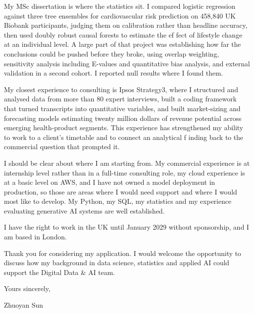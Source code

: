 \documentclass[letterpaper,11pt]{article}
\begin{document}
My MSc dissertation is where the statistics sit. I compared logistic regression against three tree ensembles for cardiovascular risk prediction on 458,840 UK Biobank participants, judging them on calibration rather than headline accuracy, then used doubly robust causal forests to estimate the ef\kern0pt fect of lifestyle change at an individual level. A large part of that project was establishing how far the conclusions could be pushed before they broke, using overlap weighting, sensitivity analysis including E-values and quantitative bias analysis, and external validation in a second cohort. I reported null results where I found them.

My closest experience to consulting is Ipsos Strategy3, where I structured and analysed data from more than 80 expert interviews, built a coding framework that turned transcripts into quantitative variables, and built market-sizing and forecasting models estimating twenty million dollars of revenue potential across emerging health-product segments. This experience has strengthened my ability to work to a client's timetable and to connect an analytical f\kern0pt inding back to the commercial question that prompted it.

I should be clear about where I am starting from. My commercial experience is at internship level rather than in a full-time consulting role, my cloud experience is at a basic level on AWS, and I have not owned a model deployment in production, so those are areas where I would need support and where I would most like to develop. My Python, my SQL, my statistics and my experience evaluating generative AI systems are well established.

I have the right to work in the UK until January 2029 without sponsorship, and I am based in London.

Thank you for considering my application. I would welcome the opportunity to discuss how my background in data science, statistics and applied AI could support the Digital Data \& AI team.

\vspace{2pt}
Yours sincerely,

\vspace{8pt}
Zhuoyan Sun
\end{document}
